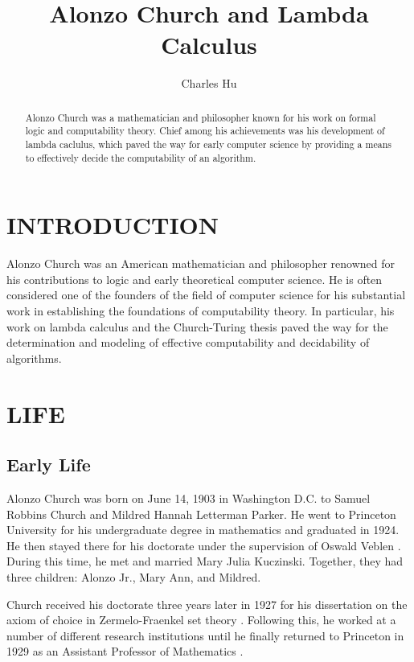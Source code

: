 \documentclass[letterpaper, 10 pt, conference]{ieeeconf}  %
\title{\LARGE \bf
Alonzo Church and Lambda Calculus
}
\author{Charles Hu%
}
\begin{document}
\maketitle
\thispagestyle{empty}
\pagestyle{empty}
\begin{abstract}

Alonzo Church was a mathematician and philosopher known for his work on formal logic and computability theory. Chief among his achievements was his development of lambda caclulus, which paved the way for early computer science by providing a means to effectively decide the computability of an algorithm.

\end{abstract}
\section{INTRODUCTION}

Alonzo Church was an American mathematician and philosopher renowned for his contributions to logic and early theoretical computer science. He is often considered one of the founders of the field of computer science for his substantial work in establishing the foundations of computability theory. In particular, his work on lambda calculus and the Church-Turing thesis paved the way for the determination and modeling of effective computability and decidability of algorithms.

\section{LIFE}

\subsection{Early Life}

Alonzo Church was born on June 14, 1903 in Washington D.C. to Samuel Robbins Church and Mildred Hannah Letterman Parker. He went to Princeton University for his undergraduate degree in mathematics and graduated in 1924. He then stayed there for his doctorate under the supervision of Oswald Veblen \cite{Connor}. During this time, he met and married Mary Julia Kuczinski. Together, they had three children: Alonzo Jr., Mary Ann, and Mildred.

Church received his doctorate three years later in 1927 for his dissertation on the axiom of choice in Zermelo-Fraenkel set theory \cite{Church5}. Following this, he worked at a number of different research institutions until he finally returned to Princeton in 1929 as an Assistant Professor of Mathematics \cite{Connor}.
\end{document}
